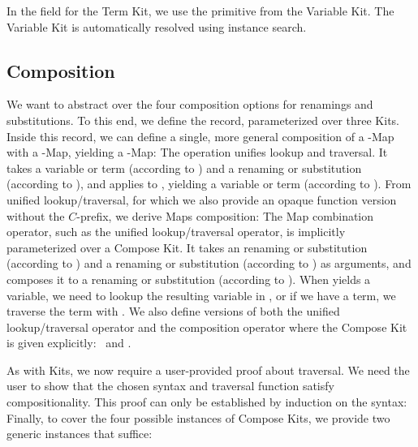 \documentclass[screen,nonacm]{acmart}
\begin{document}
\noindent In the  field for the Term Kit, we use the  primitive from the
Variable Kit. The Variable Kit is automatically resolved using
instance search.

\subsection{Composition}\label{sec:ags-com}
We want to abstract over the four composition options for renamings and
substitutions. To this end, we define the  record,
parameterized over three Kits. Inside this record, we can define a single, more
general composition of a -Map with a -Map, yielding
a -Map: \AComposeKit{}The operation 
unifies lookup and traversal. It takes a variable or term 
(according to ) and a renaming or substitution 
(according to ), and applies  to ,
yielding a variable or term (according to ). From unified
lookup/traversal, for which we also provide an opaque function version without
the $C$-prefix, we derive Maps composition: \ACompDef{}The Map combination
operator, such as the unified lookup/traversal operator, is implicitly
parameterized over a Compose Kit. It takes an renaming or substitution
 (according to ) and a renaming or substitution
 (according to ) as arguments, and composes it to a
renaming or substitution (according to ). When 
\AgdaFunction{\&}  yields a variable, we need to lookup the
resulting variable in , or if we have a term, we traverse the
term with . We also define versions of both the unified
lookup/traversal operator and the composition operator where the Compose Kit is
given explicitly: \ACompExp\ and \ALoAExp.

As with Kits, we now require a user-provided proof about traversal. We need the
user to show that the chosen syntax and traversal function satisfy
compositionality. This proof can only be established by induction on the
syntax: \ACompositionality{}Finally, to cover the four possible instances of
Compose Kits, we provide two generic instances that suffice:

\noindent\begin{minipage}{0.43\linewidth}
      \raggedright{}
      \AInstanceCRen{}
\end{minipage}
\begin{minipage}{0.53\linewidth}
      \raggedright{}
      \AInstanceCSub{}
\end{minipage}
\end{document}
